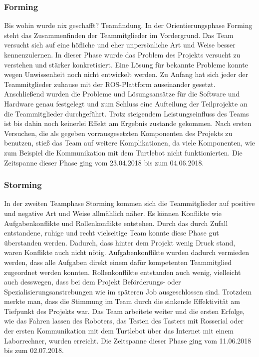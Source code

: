 \documentclass[a4paper,12pt,headsepline]{scrartcl}
\begin{document}
	\subsubsection{Forming}
		Bis wohin wurde nix geschafft? Teamfindung.
		In der Orientierungsphase Forming steht das Zusammenfinden der Teammitglieder im Vordergrund. Das Team versucht sich auf eine höfliche und eher unpersönliche Art und Weise besser kennenzulernen. In dieser Phase wurde das Problem des Projekts versucht zu verstehen und stärker konkretisiert. Eine Lösung für bekannte Probleme konnte wegen Unwissenheit noch nicht entwickelt werden. Zu Anfang hat sich jeder der Teammitglieder zuhause mit der ROS-Plattform auseinander gesetzt. Anschließend wurden die Probleme und Lösungsansätze für die Software und Hardware genau festgelegt und zum Schluss eine Aufteilung der Teilprojekte an die Teammitglieder durchgeführt. Trotz steigendem Leistungseinfluss des Teams ist bis dahin noch keinerlei Effekt am Ergebnis zustande gekommen. Nach ersten Versuchen, die als gegeben vorrausgesetzten Komponenten des Projekts zu benutzen, stieß das Team auf weitere Komplikationen, da viele Komponenten, wie zum Beispiel die Kommunikation mit dem Turtlebot nicht funktionierten. Die Zeitspanne dieser Phase ging vom 23.04.2018 bis zum 04.06.2018. 
	\subsubsection{Storming}
		In der zweiten Teamphase Storming kommen sich die Teammitglieder auf positive und negative Art und Weise allmählich näher. Es können Konflikte wie Aufgabenkonflikte und Rollenkonflikte entstehen. Durch das durch Zufall entstandene, ruhige und recht vielseitige Team konnte diese Phase gut überstanden werden. Dadurch, dass hinter dem Projekt wenig Druck stand, waren Konflikte auch nicht nötig. Aufgabenkonflikte wurden dadurch vermieden werden, dass alle Aufgaben direkt einem dafür kompetenten Teammitglied zugeordnet werden konnten. Rollenkonflikte entstanden auch wenig, vielleicht auch desswegen, dass bei dem Projekt Beförderungs- oder Spezialisierungsanstrebungen wie im späteren Job ausgeschlossen sind. Trotzdem merkte man, dass die Stimmung im Team durch die sinkende Effektivität am Tiefpunkt des Projekts war. Das Team arbeitete weiter und die ersten Erfolge, wie das Fahren lassen des Roboters, das Testen des Tasters mit Rosserial oder der ersten Kommunikation mit dem Turtlebot über das Internet mit einem Laborrechner, wurden erreicht. Die Zeitspanne dieser Phase ging vom 11.06.2018 bis zum 02.07.2018.
\end{document}

